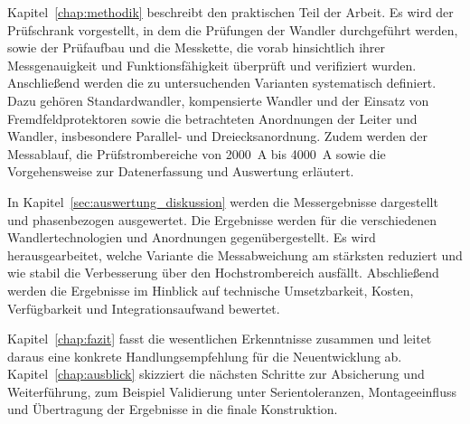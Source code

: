 Kapitel~\ref{chap:methodik} beschreibt den praktischen Teil der Arbeit. Es wird der Prüfschrank vorgestellt, in dem die Prüfungen der Wandler durchgeführt werden, sowie der Prüfaufbau und die Messkette, die vorab hinsichtlich ihrer Messgenauigkeit und Funktionsfähigkeit überprüft und verifiziert wurden. Anschließend werden die zu untersuchenden Varianten systematisch definiert. Dazu gehören Standardwandler, kompensierte Wandler und der Einsatz von Fremdfeldprotektoren sowie die betrachteten Anordnungen der Leiter und Wandler, insbesondere Parallel- und Dreiecksanordnung. Zudem werden der Messablauf, die Prüfstrombereiche von \SI{2000}{A} bis \SI{4000}{A} sowie die Vorgehensweise zur Datenerfassung und Auswertung erläutert.

In Kapitel~\ref{sec:auswertung_diskussion} werden die Messergebnisse dargestellt und phasenbezogen ausgewertet. Die Ergebnisse werden für die verschiedenen Wandlertechnologien und Anordnungen gegenübergestellt. Es wird herausgearbeitet, welche Variante die Messabweichung am stärksten reduziert und wie stabil die Verbesserung über den Hochstrombereich ausfällt. Abschließend werden die Ergebnisse im Hinblick auf technische Umsetzbarkeit, Kosten, Verfügbarkeit und Integrationsaufwand bewertet.

Kapitel~\ref{chap:fazit} fasst die wesentlichen Erkenntnisse zusammen und leitet daraus eine konkrete Handlungsempfehlung für die Neuentwicklung ab. Kapitel~\ref{chap:ausblick} skizziert die nächsten Schritte zur Absicherung und Weiterführung, zum Beispiel Validierung unter Serientoleranzen, Montageeinfluss und Übertragung der Ergebnisse in die finale Konstruktion.

